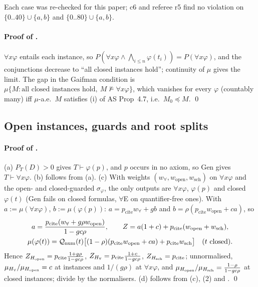 Each case was re-checked for this paper; c6 and referee r5 find no violation on $\{0..40\}\cup\{a,b\}$ and $\{0..80\}\cup\{a,b\}$.

\paragraph{Proof of .} $\forall x\varphi$ entails each instance, so $P(\forall x\varphi\wedge\bigwedge_{i\le n}\varphi(t_i))=P(\forall x\varphi)$, and the conjunctions decrease to ``all closed instances hold''; continuity of $\mu$ gives the limit. The gap in the Gaifman condition is $\mu\{M:\text{all closed instances hold},\ M\nvDash\forall x\varphi\}$, which vanishes for every $\varphi$ (countably many) iff $\mu$-a.e.\ $M$ satisfies (i) of AS Prop~4.7, i.e.\ $M_0\preccurlyeq M$. \qed

\subsection{Open instances, guards and root splits}\label{app:univ:open}

\paragraph{Proof of .} (a) $P_T(D)>0$ gives $T\vdash\varphi(p)$, and $p$ occurs in no axiom, so Gen gives $T\vdash\forall x\varphi$. (b) follows from (a). (c) With weights $(w_\forall,w_{\mathrm{open}},w_{\mathrm{sch}})$ on $\forall x\varphi$ and the open- and closed-guarded $\sigma_\varphi$, the only outputs are $\forall x\varphi$, $\varphi(p)$ and closed $\varphi(t)$ (Gen fails on closed formulas, $\forall$E on quantifier-free ones). With $a:=\mu(\forall x\varphi)$, $b:=\mu(\varphi(p))$: $a=p_{\mathrm{cite}}w_\forall+gb$ and $b=\rho(p_{\mathrm{cite}}w_{\mathrm{open}}+ca)$, so
\begin{gather*}
a=\frac{p_{\mathrm{cite}}(w_\forall+g\rho w_{\mathrm{open}})}{1-gc\rho},\qquad Z=a(1+c)+p_{\mathrm{cite}}(w_{\mathrm{open}}+w_{\mathrm{sch}}),\\
\mu(\varphi(t))=\mathcal{Q}_{\mathrm{num}}(t)\big[(1-\rho)(p_{\mathrm{cite}}w_{\mathrm{open}}+ca)+p_{\mathrm{cite}}w_{\mathrm{sch}}\big]\quad(t\text{ closed}).
\end{gather*}
Hence $Z_{H_{\mathrm{open}}}=p_{\mathrm{cite}}\frac{1+g\rho}{1-gc\rho}$, $Z_{H_{\forall}}=p_{\mathrm{cite}}\frac{1+c}{1-gc\rho}$, $Z_{H_{\mathrm{sch}}}=p_{\mathrm{cite}}$; unnormalised, $\mu_{H_{\forall}}/\mu_{H_{\mathrm{open}}}=c$ at instances and $1/(g\rho)$ at $\forall x\varphi$, and $\mu_{H_{\mathrm{open}}}/\mu_{H_{\mathrm{sch}}}=\frac{1-\rho}{1-gc\rho}$ at closed instances; divide by the normalisers. (d) follows from (c), (2) and . \qed

